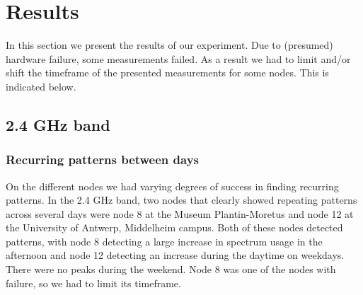 \documentclass[a4paper, 11pt]{article}
\begin{document}
\section{Results}
In this section we present the results of our experiment. Due to (presumed) hardware failure, some measurements failed. As a result we had to limit and/or shift the timeframe of the presented measurements for some nodes. This is indicated below.
\subsection{2.4 GHz band}
\subsubsection{Recurring patterns between days} 
On the different nodes we had varying degrees of success in finding recurring patterns. In the 2.4 GHz band, two nodes that clearly showed repeating patterns across several days were node 8 at the Museum Plantin-Moretus and node 12 at the University of Antwerp, Middelheim campus. Both of these nodes detected patterns, with node 8 detecting a large increase in spectrum usage in the afternoon and node 12 detecting an increase during the daytime on weekdays. There were no peaks during the weekend. Node 8 was one of the nodes with failure, so we had to limit its timeframe.
\end{document}
